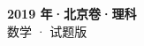 \documentclass[zihao=-4, a4paper]{ctexart}
\begin{document}
\begin{center}
  {\Large\bfseries 2019 年·北京卷·理科}\\[4pt]
  {\large 数学 · 试题版}
\end{center}
\medskip
{}

\end{document}
